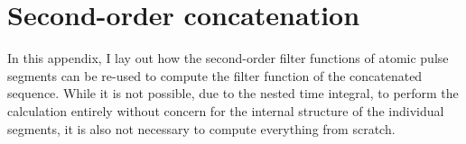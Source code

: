 \section{Second-order concatenation}\label{sec:app:ff:concatenation}
In this appendix, I lay out how the second-order filter functions of atomic pulse segments can be re-used to compute the filter function of the concatenated sequence.
While it is not possible, due to the nested time integral, to perform the calculation entirely without concern for the internal structure of the individual segments, it is also not necessary to compute everything from scratch.
